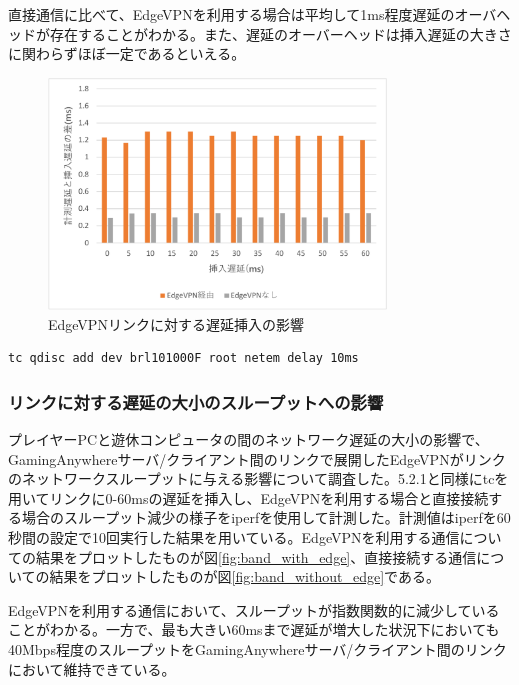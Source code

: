 直接通信に比べて、EdgeVPNを利用する場合は平均して1ms程度遅延のオーバヘッドが存在することがわかる。また、遅延のオーバーヘッドは挿入遅延の大きさに関わらずほぼ一定であるといえる。

\begin{figure}[t]
    \centering
    \includegraphics[width=0.8\textwidth,keepaspectratio,clip]{img/graph_ratency.pdf}
    \caption{EdgeVPNリンクに対する遅延挿入の影響}
    \label{fig:ratency}
\end{figure}

\begin{lstlisting}[caption=遅延挿入,label=add_ratency]
    tc qdisc add dev brl101000F root netem delay 10ms
\end{lstlisting}

\subsubsection{リンクに対する遅延の大小のスループットへの影響}
プレイヤーPCと遊休コンピュータの間のネットワーク遅延の大小の影響で、GamingAnywhereサーバ/クライアント間のリンクで展開したEdgeVPNがリンクのネットワークスループットに与える影響について調査した。5.2.1と同様にtcを用いてリンクに0-60msの遅延を挿入し、EdgeVPNを利用する場合と直接接続する場合のスループット減少の様子をiperf\cite{iperf}を使用して計測した。計測値はiperfを60秒間の設定で10回実行した結果を用いている。EdgeVPNを利用する通信についての結果をプロットしたものが図\ref{fig:band_with_edge}、直接接続する通信についての結果をプロットしたものが図\ref{fig:band_without_edge}である。

EdgeVPNを利用する通信において、スループットが指数関数的に減少していることがわかる。一方で、最も大きい60msまで遅延が増大した状況下においても40Mbps程度のスループットをGamingAnywhereサーバ/クライアント間のリンクにおいて維持できている。

